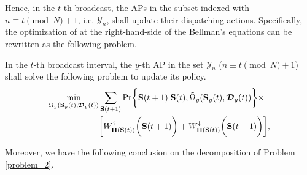 Hence, in the $t$-th broadcast, the APs in the subset indexed with $n \equiv t \pmod{N} + 1$, i.e. $\mathcal{Y}_{n}$, shall update their dispatching actions.
Specifically, the optimization of  at the right-hand-side of the Bellman's equations can be rewritten as the following problem.

\begin{problem}[]
    In the $t$-th broadcast interval, the $y$-th AP in the set $\mathcal{Y}_{n}$ ($n \equiv t \pmod{N} + 1$) shall solve the following problem to update its policy.
    {\small
    \begin{align}
        \min_{ \tilde{\Omega}_{y}(\Stat_{y}(t),\Delay_{y}(t)) }
        &\sum_{\Stat(t+1)} \Pr\Brace{
            \Stat(t+1) | \Stat(t), \tilde{\Omega}_{y}(\Stat_{y}(t),\Delay_{y}(t))
        } \times
        \nonumber\\
        &\Bracket{
            W^{\AP}_{\Baseline(\Stat(t))} \Paren{\Stat(t+1)} +
            W^{\ES}_{\Baseline(\Stat(t))} \Paren{\Stat(t+1)}
        },
    \end{align}
    }
    \label{problem_2}
\end{problem}

Moreover, we have the following conclusion on the decomposition of Problem \ref{problem_2}.
\begin{lemma}
\end{lemma}

